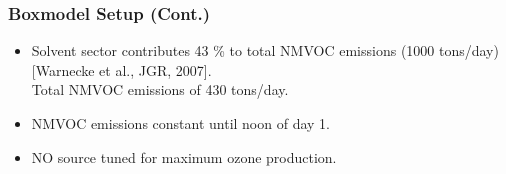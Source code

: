 \begin{frame}
    \frametitle{Boxmodel Setup (Cont.)}

    \vspace{-5mm}
    \begin{itemize}
        \item Solvent sector contributes 43 \% to total NMVOC emissions (1000 tons/day) [Warnecke et al., JGR, 2007]. \\ Total NMVOC emissions of 430 tons/day. \vspace{3mm}
        \item NMVOC emissions constant until noon of day 1.\vspace{3mm}
        \item NO source tuned for maximum ozone production. 
    \end{itemize}
\end{frame}

{
    \begin{frame}[plain]
    \end{frame}
}

{
    \begin{frame}[plain]
    \end{frame}
}

